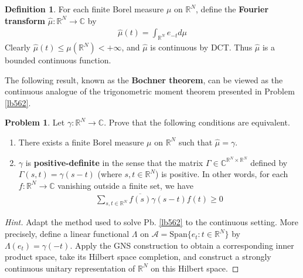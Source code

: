 \documentclass[12pt,b5paper,notitlepage]{article}
\theoremstyle{definition}
\newtheorem{df}{Definition}[subsection]
\newtheorem{prob}{\color{red}Problem}[section]
\theoremstyle{plain}
\newcommand{\wht}{\widehat}
\newcommand{\ovl}{\overline}
\newcommand{\Span}{\mathrm{Span}}
\newcommand{\scr}{\mathscr}
\newcommand{\Cbb}{\mathbb C}
\newcommand{\Rbb}{\mathbb R}
\newcommand{\eps}{\varepsilon}
\newcommand{\SA}{\mathscr A}
\numberwithin{equation}{section}
\begin{document}
\begin{df}
For each finite Borel measure $\mu$ on $\Rbb^N$, define the \textbf{Fourier transform} $\wht\mu:\Rbb^N\rightarrow\Cbb$ by
\begin{align*}
\wht\mu(t)=\int_{\Rbb^N}e_{-t}d\mu 
\end{align*}
Clearly $\wht\mu(t)\leq\mu(\Rbb^N)<+\infty$, and $\wht\mu$ is continuous by DCT. Thus $\wht\mu$ is a bounded continuous function.
\end{df}


The following result, known as the \textbf{Bochner theorem},  can be viewed as the continuous analogue of the trigonometric moment theorem presented in Problem \ref{lb562}.

\begin{prob}
Let $\gamma:\Rbb^N\rightarrow\Cbb$. Prove that the following conditions are equivalent.
\begin{enumerate}
\item[(1)] There exists a finite Borel measure $\mu$ on $\Rbb^N$ such that $\wht\mu=\gamma$.
\item[(2)] $\gamma$ is \textbf{positive-definite} in the sense that the matrix $\Gamma\in\Cbb^{\Rbb^N\times\Rbb^N}$ defined by $\Gamma(s,t)=\gamma(s-t)$ (where $s,t\in\Rbb^N$) is positive. In other words, for each $f:\Rbb^N\rightarrow\Cbb$ vanishing outside a finite set, we have
\begin{align*}
\sum_{s,t\in\Rbb^N}\ovl{f(s)}\gamma(s-t)f(t)\geq0
\end{align*} 
\end{enumerate}
\end{prob}

\begin{proof}[Hint]
Adapt the method used to solve Pb. \ref{lb562} to the continuous setting. More precisely, define a linear functional $\Lambda$ on $\SA=\Span\{e_t:t\in\Rbb^N\}$ by $\Lambda(e_t)=\gamma(-t)$. Apply the GNS construction to obtain a corresponding inner product space, take its Hilbert space completion, and construct a strongly continuous unitary representation of $\Rbb^N$ on this Hilbert space. 
\end{proof}
\end{document}
